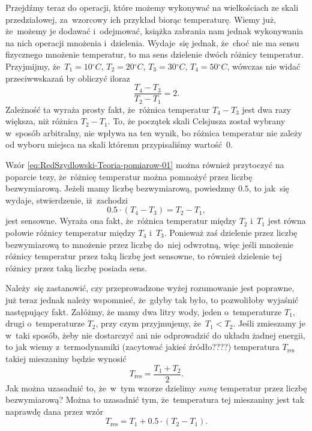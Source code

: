 \documentclass[a4paper,11pt]{article}
\numberwithin{equation}{section}
\begin{document}
Przejdźmy teraz do operacji, które możemy wykonywać na wielkościach ze skali
przedziałowej, za~wzorcowy ich przykład biorąc temperaturę. Wiemy już,
że~możemy je dodawać i~odejmować, książka zabrania nam jednak wykonywania na
nich operacji mnożenia i~dzielenia. Wydaje~się jednak, że~choć nie ma sensu
fizycznego mnożenie temperatur, to ma sens dzielenie dwóch różnicy
temperatur. Przyjmijmy,
że~$T_{ 1 } = 10 {}^{ \circ }\si{C}$, $T_{ 2 } = 20 {}^{ \circ }\si{C}$,
$T_{ 3 } = 30 {}^{ \circ }\si{C}$, $T_{ 4 } = 50 {}^{ \circ }\si{C}$, wówczas nie widać
przeciwwskazań by obliczyć iloraz
\begin{equation}
  \label{eq:RedSzydlowski-Teoria-pomiarow-01}
  \frac{ T_{ 4 } - T_{ 3 } }{ T_{ 2 } - T_{ 1 } } = 2.
\end{equation}
Zależność ta wyraża prosty fakt, że~różnica temperatur $T_{ 4 } - T_{ 3 }$
jest dwa razy większa, niż różnica $T_{ 2 } - T_{ 1 }$. To, że początek skali
Celsjusza został wybrany w~sposób arbitralny, nie wpływa na ten wynik, bo
różnica temperatur nie zależy od wyboru miejsca na skali któremu
przypisaliśmy wartość~$0$.

Wzór \eqref{eq:RedSzydlowski-Teoria-pomiarow-01} można również przytoczyć na
poparcie tezy, że~różnicę temperatur można pomnożyć przez liczbę
bezwymiarową. Jeżeli mamy liczbę bezwymiarową, powiedzmy $0.5$, to
jak~się wydaje, stwierdzenie, iż~zachodzi
\begin{equation}
  \label{eq:RedSzydlowski-Teoria-pomiarow-02}
  0.5 \cdot ( T_{ 4 } - T_{ 3 } ) = T_{ 2 } - T_{ 1 },
\end{equation}
jest sensowne. Wyraża ona fakt, że~różnica temperatur między $T_{ 2 }$
i~$T_{ 1 }$ jest równa połowie różnicy temperatur między $T_{ 4 }$ i~$T_{ 3 }$.
Ponieważ zaś dzielenie przez liczbę bezwymiarową to mnożenie przez liczbę
do~niej odwrotną, więc jeśli mnożenie różnicy temperatur przez taką liczbę
jest sensowne, to również dzielenie tej różnicy przez taką liczbę posiada
sens.

Należy~się zastanowić, czy przeprowadzone wyżej rozumowanie jest poprawne,
już teraz jednak należy wspomnieć, że~gdyby tak było, to pozwoliłoby wyjaśnić
następujący fakt. Załóżmy, że mamy dwa litry wody, jeden o~temperaturze
$T_{ 1 }$, drugi o~temperaturze $T_{ 2 }$, przy czym przyjmujemy,
że~$T_{ 1 } < T_{ 2 }$. Jeśli zmieszamy je w~taki sposób, żeby nie dostarczyć
ani nie odprowadzić do układu żadnej energii, to jak wiemy z~termodynamiki
(zacytować jakieś źródło????) temperatura $T_{ \textrm{res} }$ takiej
mieszaniny będzie wynosić
\begin{equation}
  \label{eq:RedSzydlowski-Teoria-pomiarow-03}
  T_{ \textrm{res} } = \frac{ T_{ 1 } + T_{ 2 } }{ 2 }.
\end{equation}
Jak można uzasadnić to, że~w~tym wzorze dzielimy \textit{sumę} temperatur
przez liczbę bezwymiarową? Można to uzasadnić tym, że~temperatura tej
mieszaniny jest tak naprawdę dana przez wzór
\begin{equation}
  \label{eq:RedSzydlowski-Teoria-pomiarow-04}
  T_{ \textrm{res} } = T_{ 1 } + 0.5 \cdot ( T_{ 2 } - T_{ 1 } ).
\end{equation}
\end{document}
